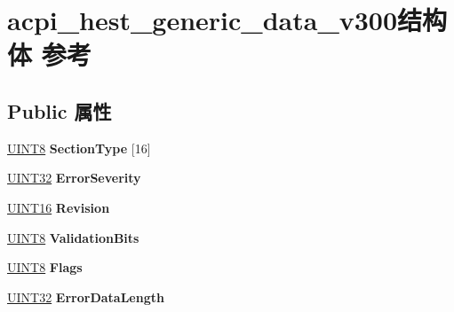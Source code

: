 \hypertarget{structacpi__hest__generic__data__v300}{}\section{acpi\+\_\+hest\+\_\+generic\+\_\+data\+\_\+v300结构体 参考}
\label{structacpi__hest__generic__data__v300}
\subsection*{Public 属性}
\begin{DoxyCompactItemize}
\item 
\mbox{\label{structacpi__hest__generic__data__v300_a3909b89850ac9727c53e6108547d4973}} 
\hyperlink{_processor_bind_8h_ab27e9918b538ce9d8ca692479b375b6a}{U\+I\+N\+T8} {\bfseries Section\+Type} \mbox{[}16\mbox{]}
\item 
\mbox{\label{structacpi__hest__generic__data__v300_ab6290b42906b9de2f20f0110a4e8d150}} 
\hyperlink{_processor_bind_8h_ae1e6edbbc26d6fbc71a90190d0266018}{U\+I\+N\+T32} {\bfseries Error\+Severity}
\item 
\mbox{\label{structacpi__hest__generic__data__v300_afb2ce0fec93bfc3dd078092f6bd3a7f6}} 
\hyperlink{_processor_bind_8h_a09f1a1fb2293e33483cc8d44aefb1eb1}{U\+I\+N\+T16} {\bfseries Revision}
\item 
\mbox{\label{structacpi__hest__generic__data__v300_aaec6061c48078ac68fa1855d5fb855eb}} 
\hyperlink{_processor_bind_8h_ab27e9918b538ce9d8ca692479b375b6a}{U\+I\+N\+T8} {\bfseries Validation\+Bits}
\item 
\mbox{\label{structacpi__hest__generic__data__v300_a9c48bdd94bd4e64b145991e1e9497d49}} 
\hyperlink{_processor_bind_8h_ab27e9918b538ce9d8ca692479b375b6a}{U\+I\+N\+T8} {\bfseries Flags}
\item 
\mbox{\label{structacpi__hest__generic__data__v300_a82e7109bb66ff23fb12890045c8003d9}} 
\hyperlink{_processor_bind_8h_ae1e6edbbc26d6fbc71a90190d0266018}{U\+I\+N\+T32} {\bfseries Error\+Data\+Length}

\end{DoxyCompactItemize}
